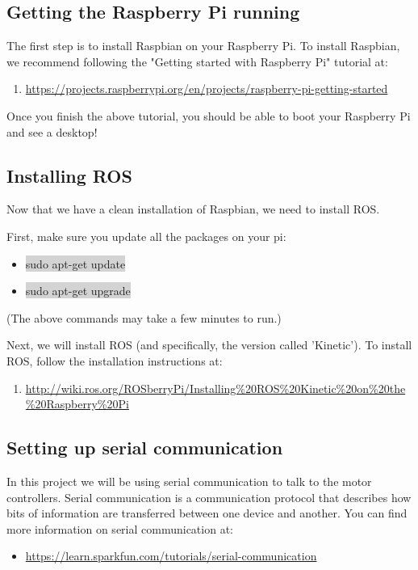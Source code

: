 \documentclass[12pt]{article}
\begin{document}
\subsection{Getting the Raspberry Pi running}
The first step is to install Raspbian on your Raspberry Pi. To install Raspbian,
we recommend following the "Getting started with Raspberry Pi" tutorial at:

\begin{enumerate}
	\item[] \href{https://projects.raspberrypi.org/en/projects/raspberry-pi-getting-started}{https://projects.raspberrypi.org/en/projects/raspberry-pi-getting-started}
\end{enumerate}

Once you finish the above tutorial, you should be able to boot your Raspberry Pi and see a desktop!




\subsection{Installing ROS}
Now that we have a clean installation of Raspbian, we need to install ROS.

First, make sure you update all the packages on your pi:
\begin{itemize}
	\item[] \colorbox{lightgray}{sudo apt-get update}
	\item[] \colorbox{lightgray}{sudo apt-get upgrade}
\end{itemize} 
(The above commands may take a few minutes to run.)

Next, we will install ROS (and specifically, the version called 'Kinetic').  To install ROS, follow the installation instructions at:
\begin{enumerate}
	\item[] \href{http://wiki.ros.org/ROSberryPi/Installing%20ROS%20Kinetic%20on%20the%20Raspberry%20Pi}{http://wiki.ros.org/ROSberryPi/Installing\%20ROS\%20Kinetic\%20on\%20the\%20Raspberry\%20Pi}
\end{enumerate}

\subsection{Setting up serial communication}	

In this project we will be using serial communication to talk to the motor controllers. Serial communication is a communication protocol that describes how bits of information are transferred between one device and another. You can find more information on serial communication at:
\begin{itemize}
	\item \href{https://learn.sparkfun.com/tutorials/serial-communication}{https://learn.sparkfun.com/tutorials/serial-communication}
\end{itemize}
\end{document}
